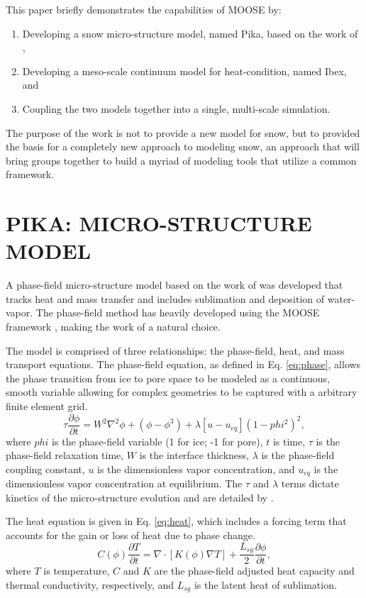 This paper briefly demonstrates the capabilities of MOOSE by:
\begin{enumerate}
\item Developing a snow micro-structure model, named Pika, based on the work of \citet{kaempfer2009phase},
\item Developing a meso-scale continuum model for heat-condition, named Ibex, and
\item Coupling the two models together into a single, multi-scale simulation.
\end{enumerate}

The purpose of the work is not to provide a new model for snow, but to provided the basis for a completely new approach to modeling snow, an approach that will bring groups together to build a myriad of modeling tools that utilize a common framework.

\section{PIKA: MICRO-STRUCTURE MODEL}\label{sec:pika}
A phase-field micro-structure model based on the work of \citet{kaemfer2009phase} was developed that tracks heat and mass transfer and includes sublimation and deposition of water-vapor. The phase-field method has heavily developed using the MOOSE framework \citep{tonks2012object}, making the work of \citet{kaempfer2009phase} a natural choice.

The model is comprised of three relationships: the phase-field, heat, and mass transport equations. The phase-field equation, as defined in Eq. \eqref{eq:phase}, allows the phase transition from ice to pore space to be modeled as a continuous, smooth variable allowing for complex geometries to be captured with a arbitrary finite element grid.
\begin{equation}\label{eq:phase}
\tau \frac{\partial \phi}{\partial t} = W^2 \nabla^2 \phi +(\phi-\phi^3)+\lambda[u-u_{eq}](1-phi^2)^2,
\end{equation}
where $phi$ is the phase-field variable (1 for ice; -1 for pore), $t$ is time, $\tau$ is the phase-field relaxation time, $W$ is the interface thickness, $\lambda$ is the phase-field coupling constant, $u$ is the dimensionless vapor concentration, and $u_{eq}$ is the dimensionless vapor concentration at equilibrium. The $\tau$ and $\lambda$ terms dictate kinetics of the micro-structure evolution and are detailed by \citet{kaempfer2009phase}.

The heat equation is given in Eq. \eqref{eq:heat}, which includes a forcing term that accounts for the gain or loss of heat due to phase change.
\begin{equation}\label{eq:heat}
C(\phi)\frac{\partial T}{\partial t} = \nabla \cdot [K(\phi) \nabla T] + \frac{L_{sg}}{2}\frac{\partial \phi}{\partial t},
\end{equation}
where $T$ is temperature, $C$ and $K$ are the phase-field adjusted heat capacity and thermal conductivity, respectively, and $L_{sg}$ is the latent heat of sublimation.

